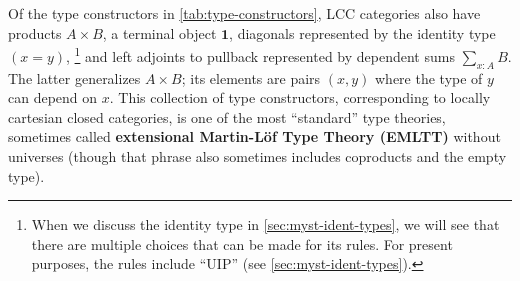 \documentclass[10pt]{article}
\let\jdeq\equiv
\def\ty{\;\mathsf{type}}
\def\N{\mathbb{N}}
\def\tsm{\textstyle\sum}
\def\proj#1{\mathsf{pr}_{#1}}
\def\types{\vdash}
\def\equiv{\mathsf{Equiv}}
\def\succ{\mathsf{succ}}
\def\unit{\mathbf{1}}
\numberwithin{equation}{section}
\begin{document}
Of the type constructors in \cref{tab:type-constructors}, LCC categories also have products $A\times B$, a terminal object $\unit$, diagonals represented by the identity type $(x=y)$,%
\footnote{When we discuss the identity type in \cref{sec:myst-ident-types}, we will see that there are multiple choices that can be made for its rules.
For present purposes, the rules include ``UIP'' (see \cref{sec:myst-ident-types}).}
and left adjoints to pullback represented by dependent sums $\sum_{x:A} B$.
The latter generalizes $A\times B$; its elements are pairs $(x,y)$ where the type of $y$ can depend on $x$.
This collection of type constructors, corresponding to locally cartesian closed categories, is one of the most ``standard'' type theories, sometimes called \textbf{extensional Martin-L\"of Type Theory (EMLTT)} without universes (though that phrase also sometimes includes coproducts and the empty type).

\end{document}
